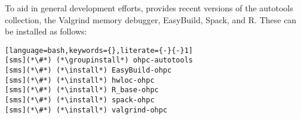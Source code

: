 To aid in general development efforts, \OHPC{} provides recent versions of the \GNU{}
autotools collection, the Valgrind memory debugger, EasyBuild, Spack, and R. These can be installed as follows:

\begin{lstlisting}[language=bash,keywords={},literate={-}{-}1]
[sms](*\#*) (*\groupinstall*) ohpc-autotools
[sms](*\#*) (*\install*) EasyBuild-ohpc
[sms](*\#*) (*\install*) hwloc-ohpc
[sms](*\#*) (*\install*) R_base-ohpc            
[sms](*\#*) (*\install*) spack-ohpc
[sms](*\#*) (*\install*) valgrind-ohpc
\end{lstlisting}
